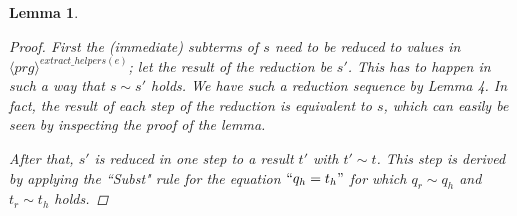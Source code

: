 \documentclass[11pt]{article} %
\newtheorem{lemma}{Lemma}
\begin{document}
\begin{lemma}
\begin{proof}
First the (immediate) subterms of $s$ need to be reduced to values in $\langle prg \rangle^{extract\_helpers(e)}$; let the result of the reduction be $s'$. This has to happen in such a way that $s \sim s'$ holds. We have such a reduction sequence by Lemma 4. In fact, the result of each step of the reduction is equivalent to $s$, which can easily be seen by inspecting the proof of the lemma.

After that, $s'$ is reduced in one step to a result $t'$ with $t' \sim t$. This step is derived by applying the ``Subst" rule for the equation $`` q_h = t_h "$ for which $q_r \sim q_h$ and $t_r \sim t_h$ holds.

\end{proof}

\end{lemma}
\end{document}

